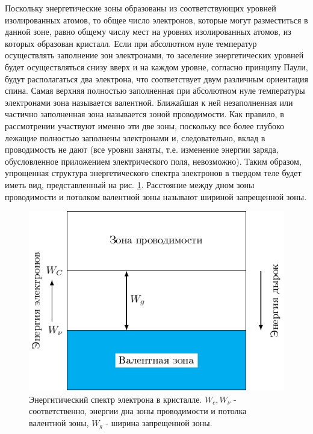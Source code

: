 	Поскольку энергетические зоны образованы из соответствующих уровней изолированных атомов, то общее число электронов,
	которые могут разместиться в данной зоне, равно общему числу мест на уровнях изолированных атомов, из которых образован
	кристалл. Если при абсолютном нуле температур осуществлять заполнение зон электронами, то заселение энергетических
	уровней будет осуществляться снизу вверх и на каждом уровне, согласно принципу Паули, будут располагаться два электрона,
	что соответствует двум различным ориентация спина. Самая верхняя полностью заполненная при абсолютном нуле температуры
	электронами зона называется валентной. Ближайшая к ней незаполненная или частично заполненная зона называется зоной
	проводимости. Как правило, в рассмотрении участвуют именно эти две зоны, поскольку все более глубоко лежащие полностью
	заполнены электронами и, следовательно, вклад в проводимость не дают (все уровни заняты, т.е. изменение энергии заряда,
	обусловленное приложением электрического поля, невозможно). Таким образом, упрощенная структура энергетического спектра
	электронов в твердом теле будет иметь вид, представленный на рис. \ref{fig:cond}. Расстояние между дном зоны проводимости и
	потолком валентной зоны называют шириной запрещенной зоны. 
	
	\begin{figure}
		\includegraphics[width = \linewidth]{img/cond.pdf}
		\caption{Энергитический спектр электрона в кристалле. $W_c,W_{\nu}$ - соответственно, энергии дна зоны проводимости и потолка валентной зоны, $W_g$ - ширина запрещенной зоны.}
		\label{fig:cond}
	\end{figure}
	
